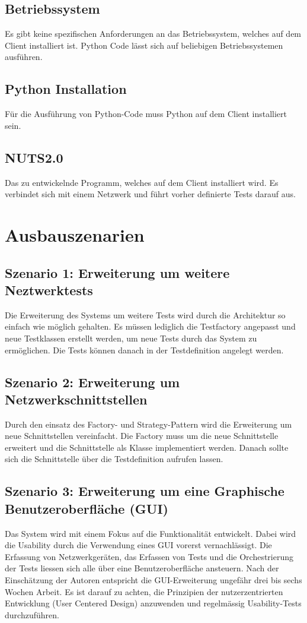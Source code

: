 \documentclass[
	ngerman,
	toc=listof, %
	toc=bibliography, %
	footnotes=multiple, %
	parskip=half, %
	numbers=noendperiod %
]{scrartcl}
\begin{document}
		\subsection{Betriebssystem}
		Es gibt keine spezifischen Anforderungen an das Betriebssystem, welches auf dem Client installiert ist.
		Python Code lässt sich auf beliebigen Betriebssystemen ausführen.

		\subsection{Python Installation}
		Für die Ausführung von Python-Code muss Python auf dem Client installiert sein. 

		\subsection{NUTS2.0}
		Das zu entwickelnde Programm, welches auf dem Client installiert wird. 
		Es verbindet sich mit einem Netzwerk und führt vorher definierte Tests darauf aus.

\section{Ausbauszenarien}
	\subsection{Szenario 1: Erweiterung um weitere Neztwerktests}
	Die Erweiterung des Systems um weitere Tests wird durch die Architektur so einfach wie möglich gehalten.
	Es müssen lediglich die Testfactory angepasst und neue Testklassen erstellt werden, um neue Tests durch das System zu ermöglichen.
	Die Tests können danach in der Testdefinition angelegt werden.

	\subsection{Szenario 2: Erweiterung um Netzwerkschnittstellen}
	Durch den einsatz des Factory- und Strategy-Pattern wird die Erweiterung um neue Schnittstellen vereinfacht.
	Die Factory muss um die neue Schnittstelle erweitert und die Schnittstelle als Klasse implementiert werden.
	Danach sollte sich die Schnittstelle über die Testdefinition aufrufen lassen.

	\subsection{Szenario 3: Erweiterung um eine Graphische Benutzeroberfläche (GUI)}
	Das System wird mit einem Fokus auf die Funktionalität entwickelt.
	Dabei wird die Usability durch die Verwendung eines GUI vorerst vernachlässigt.
	Die Erfassung von Netzwerkgeräten, das Erfassen von Tests und die Orchestrierung der Tests liessen sich alle über eine Benutzeroberfläche ansteuern.
	Nach der Einschätzung der Autoren entspricht die GUI-Erweiterung ungefähr drei bis sechs Wochen Arbeit.
	Es ist darauf zu achten, die Prinzipien der nutzerzentrierten Entwicklung (User Centered Design) anzuwenden und regelmässig Usability-Tests durchzuführen.
\end{document}
